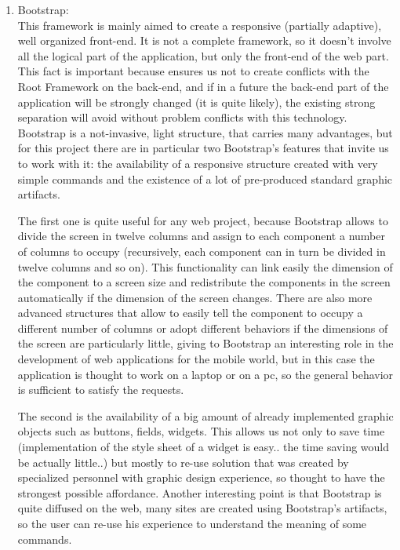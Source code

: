 \begin{enumerate}
\item
Bootstrap:
\\
\noindent
This framework is mainly aimed to create a responsive (partially adaptive), well organized front-end. It is not a complete framework, so it doesn't involve all the logical part of the application, but only the front-end of the web part. This fact is important because ensures us not to create conflicts with the Root Framework on the back-end, and if in a future the back-end part of the application will be strongly changed (it is quite likely), the existing strong separation will avoid without problem conflicts with this technology. Bootstrap is a not-invasive, light structure, that carries many advantages, but for this project there are in particular two Bootstrap's features that invite us to work with it: the availability of a responsive structure created with very simple commands and the existence of a lot of pre-produced standard graphic artifacts. 

The first one is quite useful for any web project, because Bootstrap allows to divide the screen in twelve columns and assign to each component a number of columns to occupy (recursively, each component can in turn be divided in twelve columns and so on). This functionality can link easily the dimension of the component to a screen size and redistribute the components in the screen automatically if the dimension of the screen changes. There are also more advanced structures that allow to easily tell the component to occupy a different number of columns or adopt different behaviors if the dimensions of the screen are particularly little, giving to Bootstrap an interesting role in the development of web applications for the mobile world, but in this case the application is thought to work on a laptop or on a pc, so the general behavior is sufficient to satisfy the requests.



The second is the availability of a big amount of already implemented graphic objects such as buttons, fields, widgets. This allows us not only to save time (implementation of the style sheet of a widget is easy.. the time saving would be actually little..) but mostly to re-use solution that was created by specialized personnel with graphic design experience, so thought to have the strongest possible affordance. Another interesting point is that Bootstrap is quite diffused on the web, many sites are created using Bootstrap's artifacts, so the user can re-use his experience to understand the meaning of some commands. 
  

\end{enumerate}
